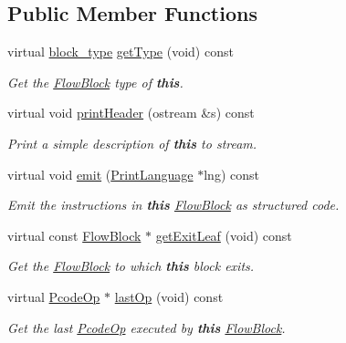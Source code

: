 \subsection*{Public Member Functions}
\begin{DoxyCompactItemize}
\item 
virtual \mbox{\hyperlink{class_flow_block_a70df78390870fcdd51e31426ba6a193e}{block\+\_\+type}} \mbox{\hyperlink{class_block_list_ab77ac8f833192e59773b7e3829823dc5}{get\+Type}} (void) const
\begin{DoxyCompactList}\small\item\em Get the \mbox{\hyperlink{class_flow_block}{Flow\+Block}} type of {\bfseries{this}}. \end{DoxyCompactList}\item 
virtual void \mbox{\hyperlink{class_block_list_ac49227f39d0238f4d86c76a170cc009b}{print\+Header}} (ostream \&s) const
\begin{DoxyCompactList}\small\item\em Print a simple description of {\bfseries{this}} to stream. \end{DoxyCompactList}\item 
virtual void \mbox{\hyperlink{class_block_list_a391529d850ca5f97c74acee00c080c43}{emit}} (\mbox{\hyperlink{class_print_language}{Print\+Language}} $\ast$lng) const
\begin{DoxyCompactList}\small\item\em Emit the instructions in {\bfseries{this}} \mbox{\hyperlink{class_flow_block}{Flow\+Block}} as structured code. \end{DoxyCompactList}\item 
virtual const \mbox{\hyperlink{class_flow_block}{Flow\+Block}} $\ast$ \mbox{\hyperlink{class_block_list_afa30fcb7c819884d7bbfe07548b4253d}{get\+Exit\+Leaf}} (void) const
\begin{DoxyCompactList}\small\item\em Get the \mbox{\hyperlink{class_flow_block}{Flow\+Block}} to which {\bfseries{this}} block exits. \end{DoxyCompactList}\item 
virtual \mbox{\hyperlink{class_pcode_op}{Pcode\+Op}} $\ast$ \mbox{\hyperlink{class_block_list_acd80d60a0cb7257e4ada35f62c6ddb91}{last\+Op}} (void) const
\begin{DoxyCompactList}\small\item\em Get the last \mbox{\hyperlink{class_pcode_op}{Pcode\+Op}} executed by {\bfseries{this}} \mbox{\hyperlink{class_flow_block}{Flow\+Block}}. \end{DoxyCompactList}\item 

\end{DoxyCompactItemize}
